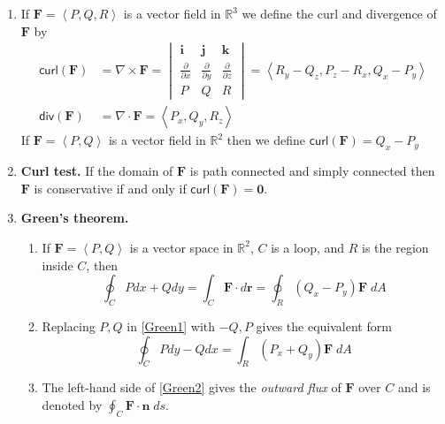 \documentclass[12pt]{article}
\begin{document}
\begin{enumerate}
\item If $\mathbold{F}=\left\langle P,Q,R\right\rangle$
is a vector field in $\mathbb{R}^3$
we define the curl and divergence of $\mathbold{F}$ by
\begin{align*}
\mathsf{curl}\left(\mathbold{F}\right)
&=\nabla\times\mathbold{F}
=\begin{vmatrix}
\mathbold{i}&\mathbold{j}&\mathbold{k}\\
\frac{\partial}{\partial x}&\frac{\partial}{\partial y}
&\frac{\partial}{\partial z}\\P&Q&R 
\end{vmatrix}
=\left\langle R_y-Q_z,P_z-R_x,Q_x-P_y\right\rangle\\
\mathsf{div}\left(\mathbold{F}\right)
&=\nabla\cdot\mathbold{F}=\left\langle P_x,Q_y,R_z\right\rangle
\end{align*}
If $\mathbold{F}=\left\langle P,Q\right\rangle$ 
is a vector field in $\mathbb{R}^2$
then we define
$\mathsf{curl}\left(\mathbold{F}\right)
=Q_x-P_y$

\item{\bf Curl test.} If the domain of $\mathbold{F}$
is path connected and simply connected then
$\mathbold{F}$ is conservative if and only if $\mathsf{curl}
\left(\mathbold{F}\right)=\mathbold{0}$.

\item{\bf Green's theorem.}
\begin{enumerate}
\item If $\mathbold{F}=\left\langle P,Q\right\rangle$ is a vector
space in $\mathbb{R}^2$, $C$ is a loop,
and $R$ is the region inside $C$, then
\begin{equation}\label{Green1}
\oint_C Pdx+Qdy
=\int_C\mathbold{F}\cdot d\mathbold{r}
=\oint_R\left(Q_x-P_y\right)\mathbold{F}\;dA
\end{equation}
\item Replacing $P,Q$ in \autoref{Green1} with $-Q,P$ gives
the equivalent form
\begin{equation}\label{Green2}
\oint_C Pdy-Qdx
=\int_R\left(P_x+Q_y\right)\mathbold{F}\;dA
\end{equation}
\item The left-hand side of \autoref{Green2} gives
the {\em outward flux} of $\mathbold{F}$ over $C$
and is denoted by $\oint_C\mathbold{F}\cdot\mathbold{n}\;ds$.
\end{enumerate}


\end{enumerate}
\end{document}
